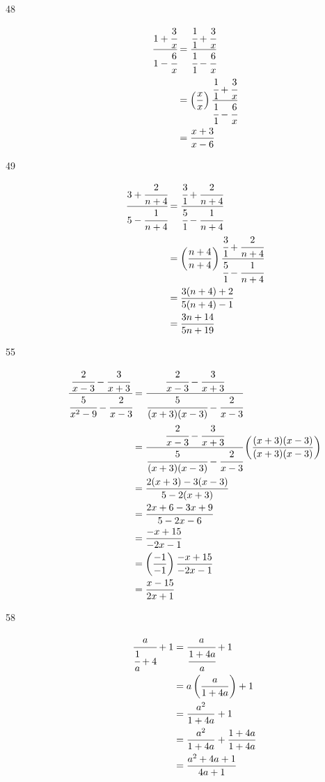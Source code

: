 \documentclass[fleqn,addpoints]{exam}
\begin{document}
\begin{description}
\item[48]
\begin{align*}
  \cfrac{1 + \cfrac{3}{x}} {1 - \cfrac{6}{x}} &= \cfrac{\cfrac{1}{1} + \cfrac{3}{x}} {\cfrac{1}{1} - \cfrac{6}{x}} \\
  &= \left( \frac{x}{x} \right)\cfrac{\cfrac{1}{1} + \cfrac{3}{x}} {\cfrac{1}{1} - \cfrac{6}{x}} \\
  &= \frac{x+3}{x-6} \\
\end{align*}

\item[49]
\begin{align*}
  \cfrac{3 + \cfrac{2}{n+4}}{5 - \cfrac{1}{n+4}} &= \cfrac{\cfrac{3}{1} + \cfrac{2}{n+4}}{\cfrac{5}{1} - \cfrac{1}{n+4}} \\
  &= \left( \frac{n+4}{n+4} \right)\cfrac{\cfrac{3}{1} + \cfrac{2}{n+4}}{\cfrac{5}{1} - \cfrac{1}{n+4}} \\
  &= \frac{3(n+4) + 2}{5(n+4) - 1} \\
  &= \frac{3n+14}{5n+19} \\
\end{align*}

\item[55]
\begin{align*}
  \cfrac{\cfrac{2}{x-3} - \cfrac{3}{x+3} } { \cfrac{5}{x^2-9} - \cfrac{2}{x-3} } 
      &= \cfrac{\cfrac{2}{x-3} - \cfrac{3}{x+3} } { \cfrac{5}{(x+3)(x-3)} - \cfrac{2}{x-3} } \\
  &= \cfrac{\cfrac{2}{x-3} - \cfrac{3}{x+3} } { \cfrac{5}{(x+3)(x-3)} - \cfrac{2}{x-3} } 
          \left( \frac{(x+3)(x-3)}{(x+3)(x-3)} \right) \\
  &= \frac{2(x+3) - 3(x-3)} { 5 - 2(x+3)} \\
  &= \frac{2x+6-3x+9} {5-2x-6} \\
  &= \frac{-x+15} {-2x-1} \\
  &= \left( \frac{-1}{-1} \right)\frac{-x+15} {-2x-1} \\
  &= \frac{x-15} {2x+1} \\
\end{align*}

\item[58]
\begin{align*}
  \cfrac{a}{\cfrac{1}{a}+4} + 1 &= \cfrac{a}{\cfrac{1+4a}{a}} + 1 \\
  &= a \left( \frac{a}{1+4a} \right) + 1 \\
  &= \frac{a^2}{1+4a} + 1 \\
  &= \frac{a^2}{1+4a} + \frac{1+4a}{1+4a} \\
  &= \frac{a^2+4a+1}{4a+1} \\
\end{align*}


\end{description}
\end{document}
